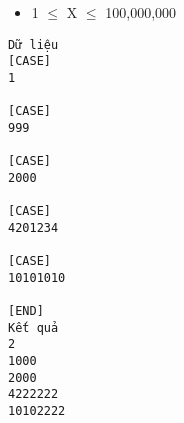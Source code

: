 \begin{itemize}
	\item     1  $\le$  X  $\le$  100,000,000   
\end{itemize}
\begin{verbatim}
Dữ liệu
[CASE]
1

[CASE]
999

[CASE]
2000

[CASE]
4201234

[CASE]
10101010

[END]
Kết quả
2
1000
2000
4222222
10102222
\end{verbatim}
